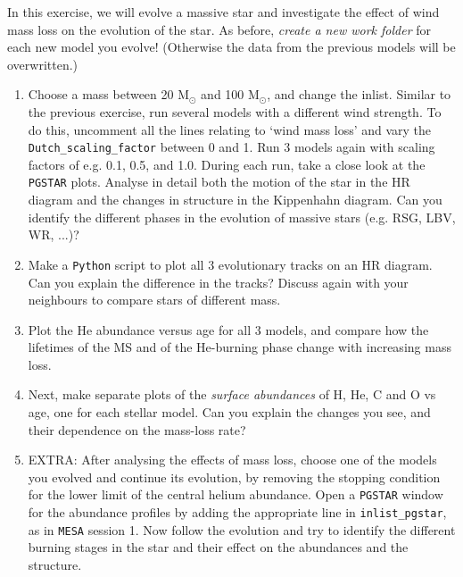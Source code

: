 \documentclass[11pt,a4paper]{article}
\begin{document}
In this exercise, we will evolve a massive star and investigate the effect of wind mass loss on the evolution of the star. As before, \emph{create a new work folder} for each new model you evolve! (Otherwise the data from the previous models will be overwritten.)
\begin{enumerate}
\item Choose a mass between 20 M$_\odot$ and 100 M$_\odot$, and change the inlist. Similar to the previous exercise, run several models with a different wind strength. To do this, uncomment all the lines relating to `wind mass loss' and vary the \verb|Dutch_scaling_factor| between 0 and 1. Run 3 models again with scaling factors of e.g. 0.1, 0.5, and 1.0. During each run, take a close look at the \texttt{PGSTAR} plots. Analyse in detail both the motion of the star in the HR diagram and the changes in structure in the Kippenhahn diagram. Can you identify the different phases in the evolution of massive stars (e.g. RSG, LBV, WR, ...)? %
\item Make a \texttt{Python} script to plot all 3 evolutionary tracks on an HR diagram. Can you explain the difference in the tracks? Discuss again with your neighbours to compare stars of different mass.
\item Plot the He abundance versus age for all 3 models, and compare how the lifetimes of the MS and of the He-burning phase change with increasing mass loss.
\item Next, make separate plots of the \emph{surface abundances} of H, He, C and O vs age, one for each stellar model. Can you explain the changes you see, and their dependence on the mass-loss rate?

\item EXTRA: After analysing the effects of mass loss, choose one of the models you evolved and continue its evolution, by removing the stopping condition for the lower limit of the central helium abundance. Open a \texttt{PGSTAR} window for the abundance profiles by adding the appropriate line in \verb|inlist_pgstar|, as in \texttt{MESA} session 1. Now follow the evolution and try to identify the different burning stages in the star and their effect on the abundances and the structure. 
\end{enumerate}



\end{document}
